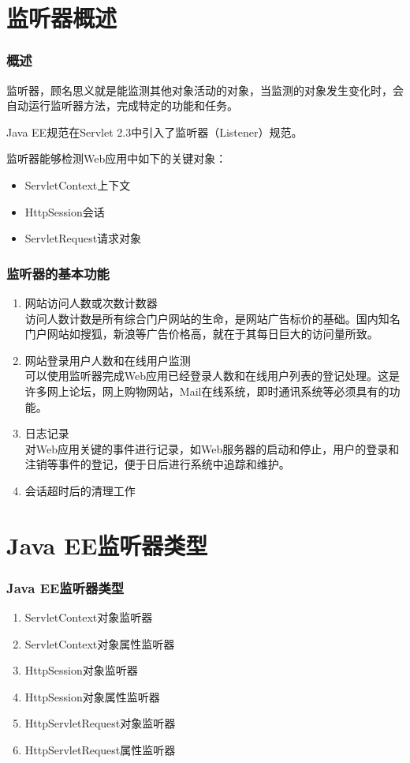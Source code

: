 \section{监听器概述}

\begin{frame}
\frametitle{概述} 

监听器，顾名思义就是能监测其他对象活动的对象，当监测的对象发生变化时，会自动运行监听器方法，完成特定的功能和任务。 

Java EE规范在Servlet 2.3中引入了监听器（Listener）规范。

监听器能够检测Web应用中如下的关键对象：

\begin{itemize}
\item ServletContext上下文
\item HttpSession会话
\item ServletRequest请求对象
\end{itemize}

\end{frame}

\begin{frame}[fragile] %
\frametitle{监听器的基本功能} 
\begin{enumerate}\kai
\item {\hei 网站访问人数或次数计数器}\\
访问人数计数是所有综合门户网站的生命，是网站广告标价的基础。国内知名门户网站如搜狐，新浪等广告价格高，就在于其每日巨大的访问量所致。	
\item {\hei 网站登录用户人数和在线用户监测}\\
可以使用监听器完成Web应用已经登录人数和在线用户列表的登记处理。这是许多网上论坛，网上购物网站，Mail在线系统，即时通讯系统等必须具有的功能。
\item {\hei 日志记录}\\
对Web应用关键的事件进行记录，如Web服务器的启动和停止，用户的登录和注销等事件的登记，便于日后进行系统中追踪和维护。
\item {\hei 会话超时后的清理工作}\\
\end{enumerate}
\end{frame}

\section{Java EE监听器类型}

\begin{frame}[fragile] %
\frametitle{Java EE监听器类型} 

\begin{enumerate}
\item ServletContext对象监听器
\item ServletContext对象属性监听器
\item HttpSession对象监听器
\item HttpSession对象属性监听器
\item HttpServletRequest对象监听器
\item HttpServletRequest属性监听器
\end{enumerate}
\end{frame}

